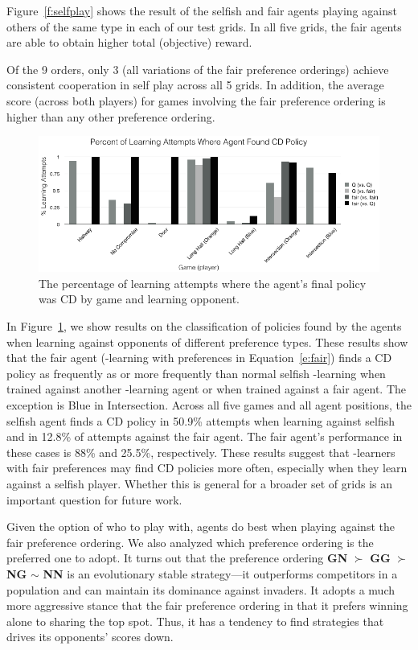 \documentclass[letterpaper]{article}
\begin{document}
Figure~\ref{f:selfplay} shows the result of the selfish and fair
agents playing against others of the same type in each of our test
grids. In all five grids, the fair agents are able to obtain higher
total (objective) reward.

Of the 9 orders, only 3 (all variations of the fair preference
orderings) achieve consistent cooperation in self play across all 5
grids. In addition, the average score (across both players) for games
involving the fair preference ordering is higher than any other
preference ordering.

\begin{figure}
\centering
\includegraphics[width=1.5\columnwidth]{figures/ConvCD.png}
\caption{The percentage of learning attempts where the agent's final policy was CD by game and learning opponent.}
\label{f:convCD}
\end{figure}

In Figure~\ref{f:convCD}, we show results on the classification of
policies found by the agents when learning against opponents of
different preference types. These results show that the fair agent
(\Q-learning with preferences in Equation~\ref{e:fair}) finds a CD
policy as frequently as or more frequently than normal
selfish \Q-learning when trained against another \Q-learning agent or
when trained against a fair agent. The exception is Blue in
Intersection. Across all five games and all agent positions, the
selfish agent finds a CD policy in 50.9\% attempts when learning
against selfish and in 12.8\% of attempts against the fair agent. The
fair agent's performance in these cases is 88\% and 25.5\%,
respectively. These results suggest that \Q-learners with fair
preferences may find CD policies more often, especially when they
learn against a selfish player. Whether this is general for a broader
set of grids is an important question for future work.

Given the option of who to play with, agents do best when playing
against the fair preference ordering. We also analyzed which
preference ordering is the preferred one to adopt. It turns out that
the preference ordering {\bf GN} $\succ$ {\bf GG} $\succ$ {\bf NG}
$\sim$ {\bf NN} is an evolutionary stable strategy---it outperforms
competitors in a population and can maintain its dominance against
invaders. It adopts a much more aggressive stance that the fair
preference ordering in that it prefers winning alone to sharing the
top spot. Thus, it has a tendency to find strategies that drives its
opponents' scores down.
\end{document}
